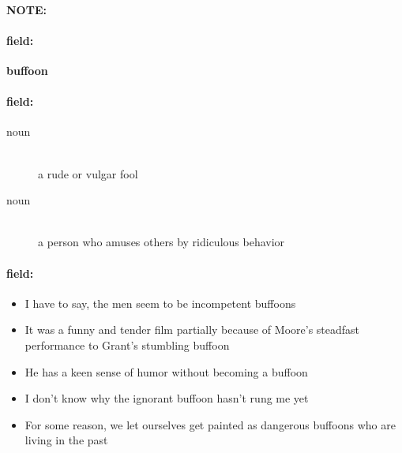 \documentclass[12pt]{article}
\newenvironment{note}{\paragraph{NOTE:}}{}
\newenvironment{field}{\paragraph{field:}}{}
\begin{document}
\begin{note}
\begin{field}
\textbf{\large buffoon}
\end{field}


\begin{field}
\begin{description}
\item[noun] \hfill \\ 
a rude or vulgar fool

\item[noun] \hfill \\ 
a person who amuses others by ridiculous behavior

\end{description}
\end{field}

\begin{field}
\begin{itemize}
\item I have to say, the men seem to be incompetent buffoons
\item It was a funny and tender film partially because of Moore's steadfast performance to Grant's stumbling buffoon
\item He has a keen sense of humor without becoming a buffoon
\item I don't know why the ignorant buffoon hasn't rung me yet
\item For some reason, we let ourselves get painted as dangerous buffoons who are living in the past
\end{itemize}
\end{field}
\end{note}
\end{document}
